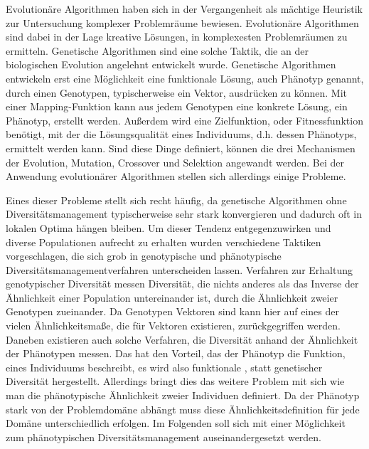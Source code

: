 Evolutionäre Algorithmen haben sich in der Vergangenheit als mächtige Heuristik zur Untersuchung komplexer Problemräume bewiesen.
Evolutionäre Algorithmen sind dabei in der Lage kreative Lösungen, in komplexesten Problemräumen zu ermitteln.
Genetische Algorithmen sind eine solche Taktik, die an der biologischen Evolution angelehnt entwickelt wurde.
Genetische Algorithmen entwickeln erst eine Möglichkeit eine funktionale Lösung, auch Phänotyp genannt, durch einen Genotypen, typischerweise ein Vektor, ausdrücken zu können.
Mit einer Mapping-Funktion kann aus jedem Genotypen eine konkrete Lösung, ein Phänotyp, erstellt werden.
Außerdem wird eine Zielfunktion, oder Fitnessfunktion benötigt, mit der die Lösungsqualität eines Individuums, d.h. dessen Phänotyps, ermittelt werden kann.
Sind diese Dinge definiert, können die drei Mechanismen der Evolution, Mutation, Crossover und Selektion angewandt werden.
Bei der Anwendung evolutionärer Algorithmen stellen sich allerdings einige Probleme.

Eines dieser Probleme stellt sich recht häufig, da genetische Algorithmen ohne Diversitätsmanagement typischerweise sehr stark konvergieren und dadurch oft in lokalen Optima hängen bleiben.
Um dieser Tendenz entgegenzuwirken und diverse Populationen aufrecht zu erhalten wurden verschiedene Taktiken vorgeschlagen, die sich grob in genotypische und phänotypische Diversitätsmanagementverfahren unterscheiden lassen.
Verfahren zur Erhaltung genotypischer Diversität messen Diversität, die nichts anderes als das Inverse der Ähnlichkeit einer Population untereinander ist, durch die Ähnlichkeit zweier Genotypen zueinander.
Da Genotypen Vektoren sind kann hier auf eines der vielen Ähnlichkeitsmaße, die für Vektoren existieren, zurückgegriffen werden.
Daneben existieren auch solche Verfahren, die Diversität anhand der Ähnlichkeit der Phänotypen messen.
Das hat den Vorteil, das der Phänotyp die Funktion, eines Individuums beschreibt, es wird also funktionale , statt genetischer Diversität hergestellt.
Allerdings bringt dies das weitere Problem mit sich wie man die phänotypische Ähnlichkeit zweier Individuen definiert.
Da der Phänotyp stark von der Problemdomäne abhängt muss diese Ähnlichkeitsdefinition für jede Domäne unterschiedlich erfolgen.
Im Folgenden soll sich mit einer Möglichkeit zum phänotypischen Diversitätsmanagement auseinandergesetzt werden.

